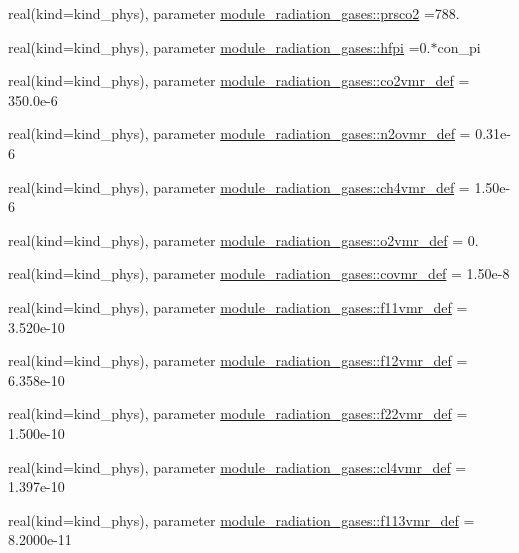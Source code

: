 \begin{DoxyCompactItemize}
real(kind=kind\+\_\+phys), parameter \hyperlink{group__module__radiation__gases_gab09dc05b8a02e9a0b56991508b599708}{module\+\_\+radiation\+\_\+gases\+::prsco2} =788.
\item 
real(kind=kind\+\_\+phys), parameter \hyperlink{group__module__radiation__gases_gab99c75954c59ed92a52de94ca6113f73}{module\+\_\+radiation\+\_\+gases\+::hfpi} =0.$\ast$con\+\_\+pi
\item 
real(kind=kind\+\_\+phys), parameter \hyperlink{group__module__radiation__gases_ga4fb5ca2e3bfaed7848d7602a22499e76}{module\+\_\+radiation\+\_\+gases\+::co2vmr\+\_\+def} = 350.\+0e-\/6
\item 
real(kind=kind\+\_\+phys), parameter \hyperlink{group__module__radiation__gases_ga858ad802efe755f8b4b5bde85996b6ae}{module\+\_\+radiation\+\_\+gases\+::n2ovmr\+\_\+def} = 0.\+31e-\/6
\item 
real(kind=kind\+\_\+phys), parameter \hyperlink{group__module__radiation__gases_gaad928d9e0064905a0b6e1eb8bb59bd23}{module\+\_\+radiation\+\_\+gases\+::ch4vmr\+\_\+def} = 1.\+50e-\/6
\item 
real(kind=kind\+\_\+phys), parameter \hyperlink{group__module__radiation__gases_ga910898e96b8afe92ebc82ce62ba682d8}{module\+\_\+radiation\+\_\+gases\+::o2vmr\+\_\+def} = 0.
\item 
real(kind=kind\+\_\+phys), parameter \hyperlink{group__module__radiation__gases_ga3554bdf03f8222d425bb6c946244cbb5}{module\+\_\+radiation\+\_\+gases\+::covmr\+\_\+def} = 1.\+50e-\/8
\item 
real(kind=kind\+\_\+phys), parameter \hyperlink{group__module__radiation__gases_ga23ae6bb6860bfefef0c281b7106f521e}{module\+\_\+radiation\+\_\+gases\+::f11vmr\+\_\+def} = 3.\+520e-\/10
\item 
real(kind=kind\+\_\+phys), parameter \hyperlink{group__module__radiation__gases_ga96d4f78070f30010626e0824b3421250}{module\+\_\+radiation\+\_\+gases\+::f12vmr\+\_\+def} = 6.\+358e-\/10
\item 
real(kind=kind\+\_\+phys), parameter \hyperlink{group__module__radiation__gases_gafd0018e96811ac64ef2abd8cab821eb5}{module\+\_\+radiation\+\_\+gases\+::f22vmr\+\_\+def} = 1.\+500e-\/10
\item 
real(kind=kind\+\_\+phys), parameter \hyperlink{group__module__radiation__gases_ga013f8faaee6df0c7c032e1786770c110}{module\+\_\+radiation\+\_\+gases\+::cl4vmr\+\_\+def} = 1.\+397e-\/10
\item 
real(kind=kind\+\_\+phys), parameter \hyperlink{group__module__radiation__gases_ga76ec88dc6284c48cfaae6cd05428b6dd}{module\+\_\+radiation\+\_\+gases\+::f113vmr\+\_\+def} = 8.\+2000e-\/11

\end{DoxyCompactItemize}
